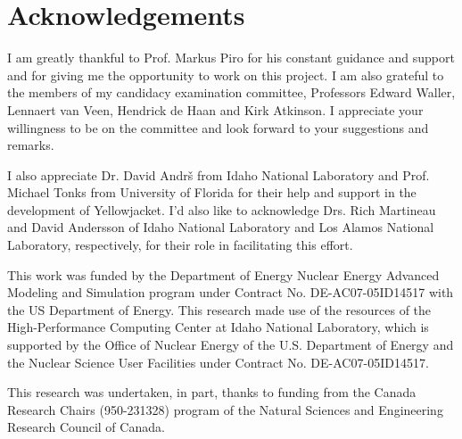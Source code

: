 \chapter*{Acknowledgements}
\label{acknowledgements}

I am greatly thankful to Prof. Markus Piro for his constant guidance and support and for giving me the opportunity to work on this project. I am also grateful to the members of my candidacy examination committee, Professors Edward Waller, Lennaert van Veen, Hendrick de Haan and Kirk Atkinson. I appreciate your willingness to be on the committee and look forward to your suggestions and remarks.

I also appreciate Dr. David Andr\v{s} from Idaho National Laboratory and Prof. Michael Tonks from University of Florida for their help and support in the development of Yellowjacket. I'd also like to acknowledge Drs. Rich Martineau and David Andersson of Idaho National Laboratory and Los Alamos National Laboratory, respectively, for their role in facilitating this effort.

This work was funded by the Department of Energy Nuclear Energy Advanced Modeling and Simulation program under Contract No. DE-AC07-05ID14517 with the US Department of Energy. This research made use of the resources of the High-Performance Computing Center at Idaho National Laboratory, which is supported by the Office of Nuclear Energy of the U.S. Department of Energy and the Nuclear Science User Facilities under Contract No. DE-AC07-05ID14517. 

This research was undertaken, in part, thanks to funding from the Canada Research Chairs (950-231328) program of the Natural Sciences and Engineering Research Council of Canada.

